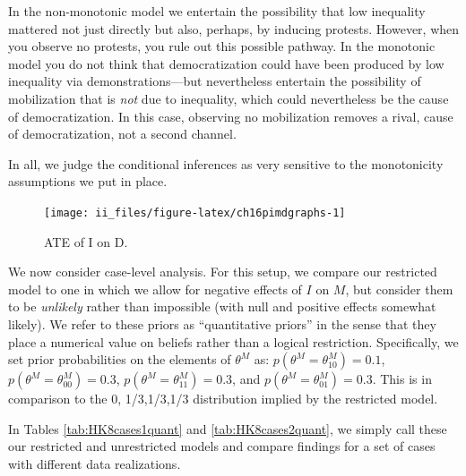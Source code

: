 \documentclass[
  12pt,
]{book}
\begin{document}
In the non-monotonic model we entertain the possibility that low inequality mattered not just directly but also, perhaps, by inducing protests. However, when you observe no protests, you rule out this possible pathway. In the monotonic model you do not think that democratization could have been produced by low inequality via demonstrations---but nevertheless entertain the possibility of mobilization that is \emph{not} due to inequality, which could nevertheless be the cause of democratization. In this case, observing no mobilization removes a rival, cause of democratization, not a second channel.

In all, we judge the conditional inferences as very sensitive to the monotonicity assumptions we put in place.

\begin{figure}

{\centering \texttt{[image: ii\_files/figure-latex/ch16pimdgraphs-1]} 

}

\caption{ATE of I on D.}\label{fig:ch16pimdgraphs}
\end{figure}

We now consider case-level analysis. For this setup, we compare our restricted model to one in which we allow for negative effects of \(I\) on \(M\), but consider them to be \emph{unlikely} rather than impossible (with null and positive effects somewhat likely). We refer to these priors as ``quantitative priors'' in the sense that they place a numerical value on beliefs rather than a logical restriction. Specifically, we set prior probabilities on the elements of \(\theta^M\) as: \(p(\theta^M=\theta^M_{10})=0.1\), \(p(\theta^M=\theta^M_{00})=0.3\), \(p(\theta^M=\theta^M_{11})=0.3\), and \(p(\theta^M=\theta^M_{01})=0.3\). This is in comparison to the 0, 1/3,1/3,1/3 distribution implied by the restricted model.

In Tables \ref{tab:HK8cases1quant} and \ref{tab:HK8cases2quant}, we simply call these our restricted and unrestricted models and compare findings for a set of cases with different data realizations.
\end{document}

